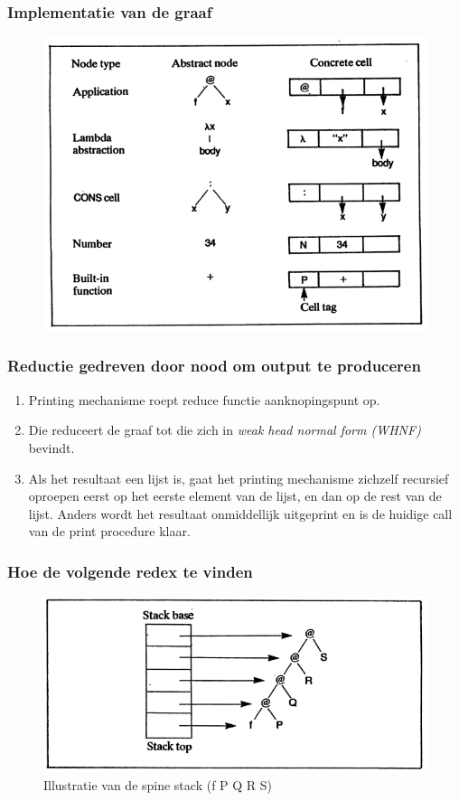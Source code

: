 \documentclass{beamer}
\begin{document}
\begin{frame}
  \frametitle{Implementatie van de graaf}
  \begin{figure}
    \includegraphics[width=\linewidth]{images/cells}
  \end{figure}
\end{frame}

\begin{frame}
  \frametitle{Reductie gedreven door nood om output te produceren}
  \begin{enumerate}
  \item Printing mechanisme roept reduce functie aanknopingspunt op.
  \item Die reduceert de graaf tot die zich in \emph{weak head normal form (WHNF)} bevindt.
  \item Als het resultaat een lijst is, gaat het printing mechanisme zichzelf recursief oproepen eerst op het eerste element van de lijst, en dan op de rest van de lijst. Anders wordt het resultaat onmiddellijk uitgeprint en is de huidige call van de print procedure klaar.
\end{enumerate}
\end{frame}

\begin{frame}
  \frametitle{Hoe de volgende redex te vinden}
  \begin{figure}[h]
    \includegraphics[width=\linewidth]{images/slpj203}
    \caption{Illustratie van de spine stack (f P Q R S)}
  \end{figure}
\end{frame}
\end{document}
